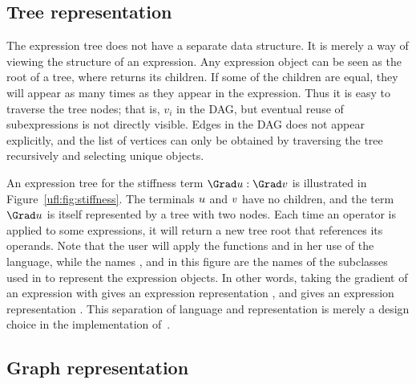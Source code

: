 \vspace*{2pt}
\subsection{Tree representation}

The expression tree does not have a separate data structure. It is merely
a way of viewing the structure of an expression. Any expression object
 can be seen as the root of a tree, where 
returns its children. If some of the children are equal, they will
appear as many times as they appear in the expression. Thus it is easy
to traverse the tree nodes; that is, $v_i$ in the DAG, but eventual
reuse of subexpressions is not directly visible. Edges in the DAG does
not appear explicitly, and the list of vertices can only be obtained by
traversing the tree recursively and selecting unique objects.

An expression tree for the stiffness term $\Grad\uu :\Grad\vv$ is
illustrated in Figure~\ref{ufl:fig:stiffness}.  The terminals ${u}$ and
${v}$ have no children, and the term $\Grad\uu$ is itself represented by a
tree with two nodes. Each time an operator is applied to some expressions,
it will return a new tree root that references its operands. Note that
the user will apply the functions  and  in her use of
the language, while the names ,  and 
in this figure are the names of the  subclasses used in \ufl{}
to represent the expression objects.  In other words, taking the gradient
of an expression with  gives an expression representation
, and  gives an expression representation
. This separation of language and representation is
merely a design choice in the implementation of~\ufl{}.

\subsection{Graph representation}\label{ufl:sec:graphs}

